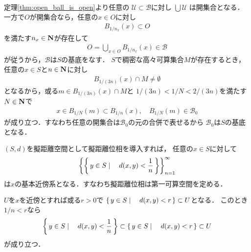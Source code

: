 	\begin{prf}
		定理\ref{thm:open_ball_is_open}より任意の
		$\mathscr{U} \subset \mathscr{B}$に対し
		$\bigcup \mathscr{U}$
		は開集合となる．一方で$O$が開集合なら，任意の$x \in O$に対し
		\begin{align}
			B_{1/n_x}(x) \subset O
		\end{align}
		を満たす$n_x \in \mathbf{N}$が存在して
		\begin{align}
			O = \bigcup_{x \in O} B_{1/n_x}(x) \in \mathscr{B}
		\end{align}
		が従うから，$\mathscr{B}$は$S$の基底をなす．
		$S$で稠密な高々可算集合$M$が存在するとき，
		任意の$x \in S$と$n \in \mathbf{N}$に対し
		\begin{align}
			B_{1/(3n)}(x) \cap M \neq \emptyset
		\end{align}
		となるから，或る$m \in B_{1/(3n)}(x) \cap M$と
		$1/(3n) < 1/N < 2/(3n)$を満たす$N \in \mathbf{N}$で
		\begin{align}
			x \in B_{1/N}(m) \subset B_{1/n}(x),\quad B_{1/N}(m) \in \mathscr{B}_0
		\end{align}
		が成り立つ．すなわち任意の開集合は$\mathscr{B}_0$の元の合併で表せるから
		$\mathscr{B}_0$は$S$の基底となる．
		\QED
	\end{prf}
	
	\begin{screen}
		\begin{thm}[擬距離位相は第一可算]
			$(S,d)$を擬距離空間として擬距離位相を導入すれば，
			任意の$x \in S$に対して
			\begin{align}
				\left\{\left\{\, y \in S \mid \quad d(x,y) < \frac{1}{n}\, \right\}\right\}_{n=1}^\infty
			\end{align}
			は$x$の基本近傍系となる．すなわち擬距離位相は第一可算空間を定める．
		\end{thm}
	\end{screen}
	
	\begin{prf}
		$U$を$x$を近傍とすれば或る$r > 0$で
		$\left\{\, y \in S \mid \quad d(x,y) < r\, \right\} \subset U$となる．
		このとき$1/n < r$なら
		\begin{align}
			\left\{\, y \in S \mid \quad d(x,y) < \frac{1}{n}\, \right\}
			\subset \left\{\, y \in S \mid \quad d(x,y) < r\, \right\} \subset U
		\end{align}
		が成り立つ．
		\QED
	\end{prf}
	
